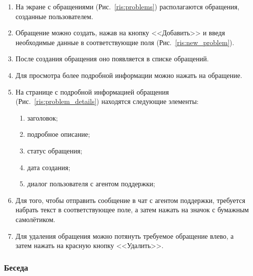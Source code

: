 \documentclass{../includes/TechDoc}
\begin{document}
    \begin{enumerate}
        \item На экране с обращениями (Рис.~\ref{ris:problems}) располагаются обращения, созданные пользователем.

        \item Обращение можно создать, нажав на кнопку <<Добавить>> и введя необходимые данные в соответствующие поля (Рис.~\ref{ris:new_problem}).

        \item После создания обращения оно появляется в списке обращений.
        \item Для просмотра более подробной информации можно нажать на обращение.
        \item На странице с подробной информацией обращения (Рис.~\ref{ris:problem_details}) находятся следующие элементы:
        \begin{enumerate}
            \item заголовок;
            \item подробное описание;
            \item статус обращения;
            \item дата создания;
            \item диалог пользователя с агентом поддержки;
        \end{enumerate}

        \item Для того, чтобы отправить сообщение в чат с агентом поддержки, требуется набрать текст
        в соответствующее поле, а затем нажать на значок с бумажным самолётиком.

        \item Для удаления обращения можно потянуть требуемое обращение влево, а затем нажать на красную кнопку <<Удалить>>.
    \end{enumerate}

    \clearpage

    \subsubsection{Беседа}
\end{document}
